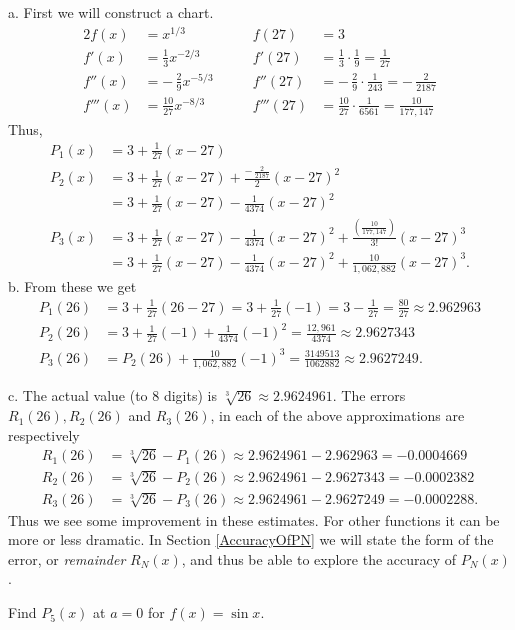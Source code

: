 a. First we will construct a chart.
\begin{alignat*}{2}
f(x)&=x^{1/3}\qquad&f(27)&=3\\
f'(x)&=\frac13x^{-2/3}\qquad&f'(27)&=\frac13\cdot\frac1{9}=\frac1{27}\\
f''(x)&=-\,\frac29x^{-5/3}\qquad&f''(27)&= -\,\frac29\cdot\frac1{243}=
	-\,\frac2{2187}\\
f'''(x)&=\frac{10}{27}x^{-8/3}\qquad
	&f'''(27)&=\frac{10}{27}\cdot\frac1{6561}
	=\frac{10}{177,147}\end{alignat*} 
Thus,
\begin{align*}
P_1(x)&=3+\frac1{27}(x-27)\\
P_2(x)&=3+\frac1{27}(x-27)+\frac{-\,\frac2{2187}}2(x-27)^2\\
	&=3+\frac1{27}(x-27)-\frac1{4374}(x-27)^2\\
P_3(x)&=3+\frac1{27}(x-27)-\frac1{4374}(x-27)^2
	+\frac{\left(\frac{10}{177,147}\right)}{3!}(x-27)^3\\
	&=3+\frac1{27}(x-27)-\frac1{4374}(x-27)^2+\frac{10}{1,062,882}(x-27)^3
	.\end{align*}
b.  From these we get
\begin{align*}
P_1(26)&=3+\frac1{27}(26-27)=3+\frac1{27}(-1)=3-\frac1{27}=\frac{80}{27}
\approx2.962963\\
P_2(26)&=3+\frac1{27}(-1)+\frac1{4374}(-1)^2=\frac{12,961}{4374}
\approx2.9627343 \\
P_3(26)&=P_2(26)+
\frac{10}{1,062,882}(-1)^3=\frac{3149513}{1062882} 
\approx2.9627249.\end{align*} 

c.  The actual value (to 8 digits) is
	$\sqrt[3]{26}\approx 2.9624961.$ 
The errors $R_1(26), R_2(26)$ and $R_3(26)$,
in each of the above approximations are respectively 
\begin{align*}
R_1(26)&=\sqrt[3]{26}-P_1(26)\approx2.9624961-2.962963=-0.0004669\\
R_2(26)&=\sqrt[3]{26}-P_2(26)\approx2.9624961-2.9627343=-0.0002382\\
R_3(26)&=\sqrt[3]{26}-P_3(26)\approx2.9624961-2.9627249=-0.0002288.
\end{align*} 
Thus we see some improvement in these estimates.  For other functions
it can be more or less dramatic.  In Section \ref{AccuracyOfPN} we
will state the form of the error, or {\it remainder} $R_N(x)$, and
thus be able to explore the accuracy of $P_N(x)$. 


\eex 
\bex
Find $P_5(x)$ at $a=0$
for $f(x)=\sin x$.
\medskip

